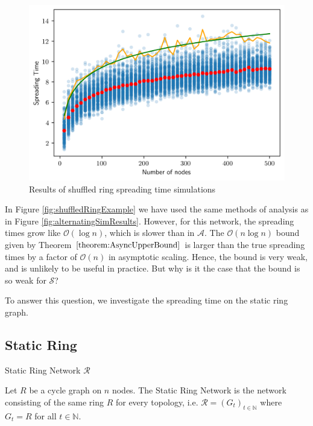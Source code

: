 \begin{figure}[h]
	\centering
	\includegraphics[width=1\textwidth]{./figures/shuffle_ring_simulation_results.png}
	\caption{Results of shuffled ring spreading time simulations}
	\label{fig:shuffleRingSimResults}
\end{figure}


In Figure \ref{fig:shuffledRingExample} we have used the same methods of analysis as in Figure \ref{fig:alternatingSimResults}. However, for this network, the spreading times grow like $\mathcal{O}(\log n)$, which is slower than in $\mathcal{A}$.
The $\mathcal{O}(n \log n)$ bound given by Theorem $\ref{theorem:AsyncUpperBound}$ is larger than the true spreading times by a factor of $\mathcal{O}(n)$ in asymptotic scaling. Hence, the bound is very weak, and is unlikely to be useful in practice. But why is it the case that the bound is so weak for $\mathcal{S}$?

To answer this question, we investigate the spreading time on the static ring graph.

\subsection{Static Ring}

\begin{definition}
	Static Ring Network $\mathcal{R}$

	\noindent
	Let $R$ be a cycle graph on $n$ nodes. The Static Ring Network is the network consisting of the same ring $R$ for every topology, i.e. $\mathcal{R} = (G_t)_{t \in \mathbb{N}}$ where $G_t = R$ for all $t \in \mathbb{N}$. 
\end{definition}

